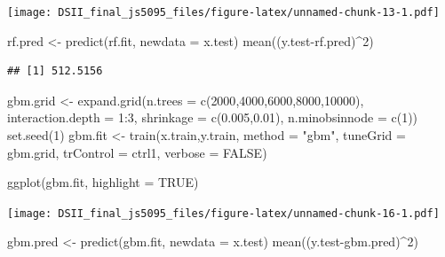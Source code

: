 \documentclass[
]{article}
\newenvironment{Shaded}{\begin{snugshade}}{\end{snugshade}}
\newcommand{\AttributeTok}[1]{\textcolor[rgb]{0.77,0.63,0.00}{#1}}
\newcommand{\ConstantTok}[1]{\textcolor[rgb]{0.00,0.00,0.00}{#1}}
\newcommand{\DecValTok}[1]{\textcolor[rgb]{0.00,0.00,0.81}{#1}}
\newcommand{\FloatTok}[1]{\textcolor[rgb]{0.00,0.00,0.81}{#1}}
\newcommand{\FunctionTok}[1]{\textcolor[rgb]{0.00,0.00,0.00}{#1}}
\newcommand{\NormalTok}[1]{#1}
\newcommand{\OtherTok}[1]{\textcolor[rgb]{0.56,0.35,0.01}{#1}}
\newcommand{\SpecialCharTok}[1]{\textcolor[rgb]{0.00,0.00,0.00}{#1}}
\newcommand{\StringTok}[1]{\textcolor[rgb]{0.31,0.60,0.02}{#1}}
\begin{document}
\texttt{[image: DSII\_final\_js5095\_files/figure-latex/unnamed-chunk-13-1.pdf]}

\begin{Shaded}
\begin{Highlighting}[]
\NormalTok{rf.pred }\OtherTok{\textless{}{-}} \FunctionTok{predict}\NormalTok{(rf.fit, }\AttributeTok{newdata =}\NormalTok{ x.test)}
\FunctionTok{mean}\NormalTok{((y.test}\SpecialCharTok{{-}}\NormalTok{rf.pred)}\SpecialCharTok{\^{}}\DecValTok{2}\NormalTok{)}
\end{Highlighting}
\end{Shaded}

\begin{verbatim}
## [1] 512.5156
\end{verbatim}

\begin{Shaded}
\begin{Highlighting}[]
\NormalTok{gbm.grid }\OtherTok{\textless{}{-}} \FunctionTok{expand.grid}\NormalTok{(}\AttributeTok{n.trees =} \FunctionTok{c}\NormalTok{(}\DecValTok{2000}\NormalTok{,}\DecValTok{4000}\NormalTok{,}\DecValTok{6000}\NormalTok{,}\DecValTok{8000}\NormalTok{,}\DecValTok{10000}\NormalTok{),}
\AttributeTok{interaction.depth =} \DecValTok{1}\SpecialCharTok{:}\DecValTok{3}\NormalTok{,}
\AttributeTok{shrinkage =} \FunctionTok{c}\NormalTok{(}\FloatTok{0.005}\NormalTok{,}\FloatTok{0.01}\NormalTok{),}
\AttributeTok{n.minobsinnode =} \FunctionTok{c}\NormalTok{(}\DecValTok{1}\NormalTok{))}
\FunctionTok{set.seed}\NormalTok{(}\DecValTok{1}\NormalTok{)}
\NormalTok{gbm.fit }\OtherTok{\textless{}{-}} \FunctionTok{train}\NormalTok{(x.train,y.train,}
                 \AttributeTok{method =} \StringTok{"gbm"}\NormalTok{,}
                 \AttributeTok{tuneGrid =}\NormalTok{ gbm.grid,}
                 \AttributeTok{trControl =}\NormalTok{ ctrl1,}
                 \AttributeTok{verbose =} \ConstantTok{FALSE}\NormalTok{)}
\end{Highlighting}
\end{Shaded}

\begin{Shaded}
\begin{Highlighting}[]
\FunctionTok{ggplot}\NormalTok{(gbm.fit, }\AttributeTok{highlight =} \ConstantTok{TRUE}\NormalTok{)}
\end{Highlighting}
\end{Shaded}

\texttt{[image: DSII\_final\_js5095\_files/figure-latex/unnamed-chunk-16-1.pdf]}

\begin{Shaded}
\begin{Highlighting}[]
\NormalTok{gbm.pred }\OtherTok{\textless{}{-}} \FunctionTok{predict}\NormalTok{(gbm.fit, }\AttributeTok{newdata =}\NormalTok{ x.test)}
\FunctionTok{mean}\NormalTok{((y.test}\SpecialCharTok{{-}}\NormalTok{gbm.pred)}\SpecialCharTok{\^{}}\DecValTok{2}\NormalTok{)}
\end{Highlighting}
\end{Shaded}
\end{document}
